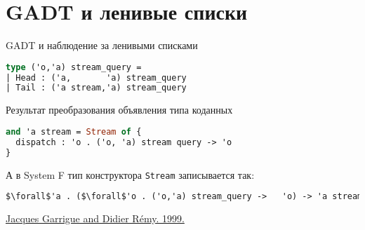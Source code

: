 \documentclass[10pt, mathserif]{beamer}
\theoremstyle{definition}
\begin{document}
\section{GADT и ленивые списки}

\begin{frame}[fragile]{GADT и наблюдение за ленивыми списками}
\begin{lstlisting}[language=ocaml,mathescape=true]
type ('o,'a) stream_query =
| Head : ('a,       'a) stream_query
| Tail : ('a stream,'a) stream_query
\end{lstlisting}
\end{frame}

\begin{frame}[fragile]{Результат преобразования объявления типа коданных}
\begin{lstlisting}[language=ocaml]
and 'a stream = Stream of {
  dispatch : 'o . ('o, 'a) stream query -> 'o
}
\end{lstlisting}

\vspace{1cm}

А в System F тип конструктора \lstinline=Stream= записывается так:
\begin{lstlisting}[language=ocaml,mathescape=true]
$\forall$'a . ($\forall$'o . ('o,'a) stream_query ->   'o) -> 'a stream
\end{lstlisting}
\vspace{1cm}
\href{https://caml.inria.fr/pub/papers/garrigue_remy-poly-ic99.ps.gz}{Jacques Garrigue and Didier Rémy. 1999. }
\end{frame}
\end{document}
